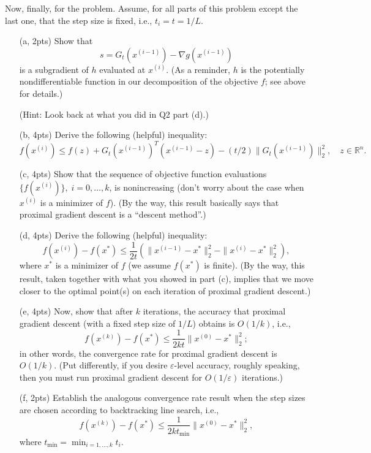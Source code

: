 \documentclass{article}
\theoremstyle{remark}
\theoremstyle{definition}
\newcommand{\reals}{\mathbb R}
\begin{document}
Now, finally, for the problem.  Assume, for all parts of this problem except the last one, that the step size is fixed, i.e., $t_i = t = 1/L$.
\begin{enumerate}
\item[(a, 2pts)] Show that
\[
s = G_{t}(x^{(i-1)}) - \nabla g(x^{(i-1)})
\]
is a subgradient of $h$ evaluated at $x^{(i)}$.  (As a reminder, $h$ is the potentially nondifferentiable function in our decomposition of the objective $f$; see above for details.)

(Hint:  Look back at what you did in Q2 part (d).)

\item[(b, 4pts)] Derive the following (helpful) inequality:
\[
f(x^{(i)}) \leq f(z) + G_t(x^{(i-1)})^T (x^{(i-1)} - z) - (t/2) \| G_t(x^{(i-1)}) \|_2^2, \quad z \in \reals^n.
\]

\item[(c, 4pts)] Show that the sequence of objective function evaluations $\{ f(x^{(i)}) \}, \; i=0,\ldots,k$, is nonincreasing (don't worry about the case when $x^{(i)}$ is a minimizer of $f$).  (By the way, this result basically says that proximal gradient descent is a ``descent method''.)

\item[(d, 4pts)] Derive the following (helpful) inequality:
\[
f(x^{(i)}) - f(x^*) \leq \frac{1}{2t} \left( \| x^{(i-1)} - x^* \|_2^2 - \| x^{(i)} - x^* \|_2^2 \right),
\]
where $x^*$ is a minimizer of $f$ (we assume $f(x^*)$ is finite).  (By the way, this result, taken together with what you showed in part (c), implies that we move closer to the optimal point(s) on each iteration of proximal gradient descent.)

\item[(e, 4pts)] Now, show that after $k$ iterations, the accuracy that proximal gradient descent (with a fixed step size of $1/L$) obtains is $O(1/k)$, i.e., 
\[
f(x^{(k)}) - f(x^*) \leq \frac{1}{2 k t} \| x^{(0)} - x^* \|_2^2;
\]
in other words, the convergence rate for proximal gradient descent is $O(1/k)$.  (Put differently, if you desire $\varepsilon$-level accuracy, roughly speaking, then you must run proximal gradient descent for $O(1/\varepsilon)$ iterations.)

\item[(f, 2pts)] Establish the analogous convergence rate result when the step sizes are chosen according to backtracking line search, i.e.,
\[
f(x^{(k)}) - f(x^*) \leq \frac{1}{2 k t_{\min}} \| x^{(0)} - x^* \|_2^2,
\]
where $t_{\min} = \min_{i=1,\ldots,k} t_i$.
\end{enumerate}
\end{document}

